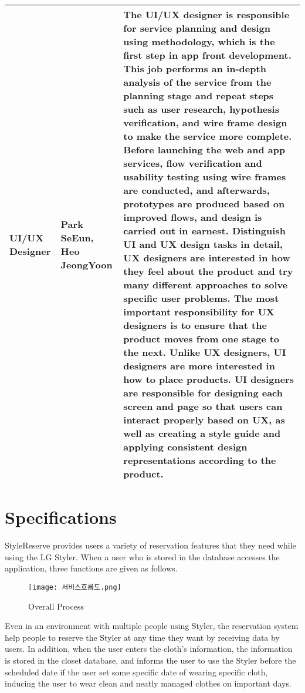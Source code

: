 \documentclass[conference]{IEEEtran}
\begin{document}
\begin{table}[htbp]
\begin{tabular}{| p{1cm}|p{1.5cm}|p{5.2cm} |}
\hline
UI/UX Designer & Park SeEun, Heo JeongYoon & The UI/UX designer is responsible for service planning and design using methodology, which is the first step in app front development. This job performs an in-depth analysis of the service from the planning stage and repeat steps such as user research, hypothesis verification, and wire frame design to make the service more complete. Before launching the web and app services, flow verification and usability testing using wire frames are conducted, and afterwards, prototypes are produced based on improved flows, and design is carried out in earnest.
Distinguish UI and UX design tasks in detail, UX designers are interested in how they feel about the product and try many different approaches to solve specific user problems. The most important responsibility for UX designers is to ensure that the product moves from one stage to the next. Unlike UX designers, UI designers are more interested in how to place products. UI designers are responsible for designing each screen and page so that users can interact properly based on UX, as well as creating a style guide and applying consistent design representations according to the product.\\

\hline
\end{tabular}
\end{table}

\newpage
\section{Specifications}
StyleReserve provides users a variety of reservation features that they need while using the LG Styler. When a user who is stored in the database accesses the application, three functions are given as follows.\\

\begin{figure}[htbp]
\centerline{\texttt{[image: 서비스흐름도.png]}}
\caption{Overall Process}
\label{fig}
\end{figure}

Even in an environment with multiple people using Styler, the reservation system help people to reserve the Styler at any time they want by receiving data by users.
In addition, when the user enters the cloth's information, the information is stored in the closet database, and informs the user to use the Styler before the scheduled date if the user set some specific date of wearing specific cloth, inducing the user to wear clean and neatly managed clothes on important days.\\
\end{document}
